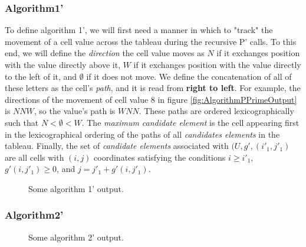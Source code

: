 \documentclass[11pt]{article}
\theoremstyle{definition}
\begin{document}
\subsubsection{Algorithm1'}
To define algorithm 1', we will first need a manner in which to "track" the movement of a cell value across the tableau during the recursive P' calls. To this end, we will define the \emph{direction} the cell value moves as $N$ if it exchanges position with the value directly above it, $W$ if it exchanges position with the value directly to the left of it, and $\emptyset$ if it does not move. We define the concatenation of all of these letters as the cell's \emph{path}, and it is read from \textbf{right to left}.  
For example, the directions of the movement of cell value 8 in figure \ref{fig:AlgorithmPPrimeOutput} is $N N W$, so the value's path is $W N N$. These paths are ordered lexicographically such that $N < \emptyset < W$. The \emph{maximum candidate element} is the cell appearing first in the lexicographical ordering of the paths of all \emph{candidates elements} in the tableau. 
Finally, the set of \emph{candidate elements} associated with $(U,g',(i'_1,j'_1)$ are all cells with $(i,j)$ coordinates satisfying the conditions $i \geq i'_1$, $g'(i,j'_1) \ge 0$, and $j = j'_1 + g'(i,j'_1)$.
\begin{algorithm}[H]
\end{algorithm}
\begin{figure}\label{fig:Algorithm1PrimeOutput}
\centering
\caption{Some algorithm 1' output.}
\end{figure}
\subsubsection{Algorithm2'}
\begin{algorithm}[H]
 
\end{algorithm}
\begin{figure}\label{fig:Algorithm2PrimeOutput}
\centering
\caption{Some algorithm 2' output.}
\end{figure}
\end{document}
